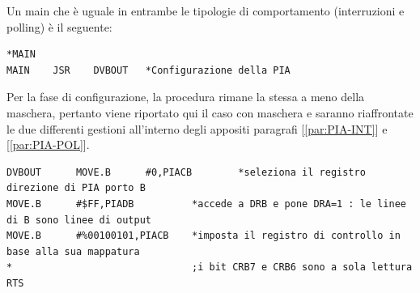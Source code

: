 Un main che è uguale in entrambe le tipologie di comportamento (interruzioni e polling) è il seguente:
\begin{lstlisting}
*MAIN
MAIN	JSR    DVBOUT	*Configurazione della PIA
\end{lstlisting}

Per la fase di configurazione, la procedura rimane la stessa a meno della maschera, pertanto viene riportato qui il caso con maschera e saranno riaffrontate le due differenti gestioni all'interno degli appositi paragrafi [\ref{par:PIA-INT}] e [\ref{par:PIA-POL}].
\begin{lstlisting}
DVBOUT      MOVE.B      #0,PIACB		*seleziona il registro direzione di PIA porto B 
MOVE.B      #$FF,PIADB	  		*accede a DRB e pone DRA=1 : le linee di B sono linee di output	
MOVE.B      #%00100101,PIACB   	*imposta il registro di controllo in base alla sua mappatura
*								;i bit CRB7 e CRB6 sono a sola lettura	
RTS
\end{lstlisting}


